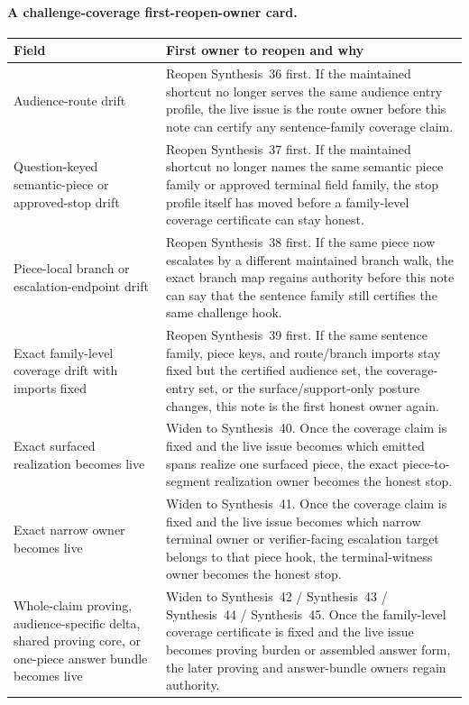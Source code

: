 \documentclass[11pt]{article}
\begin{document}
\paragraph{A challenge-coverage first-reopen-owner card.}
\begin{table}[t]
\centering
\small
\begin{tabularx}{\linewidth}{@{}LY@{}}
\toprule
Field & First owner to reopen and why \\
\midrule
Audience-route drift & Reopen Synthesis~36 first. If the maintained shortcut no longer serves the same audience entry profile, the live issue is the route owner before this note can certify any sentence-family coverage claim. \\
Question-keyed semantic-piece or approved-stop drift & Reopen Synthesis~37 first. If the maintained shortcut no longer names the same semantic piece family or approved terminal field family, the stop profile itself has moved before a family-level coverage certificate can stay honest. \\
Piece-local branch or escalation-endpoint drift & Reopen Synthesis~38 first. If the same piece now escalates by a different maintained branch walk, the exact branch map regains authority before this note can say that the sentence family still certifies the same challenge hook. \\
Exact family-level coverage drift with imports fixed & Reopen Synthesis~39 first. If the same sentence family, piece keys, and route/branch imports stay fixed but the certified audience set, the coverage-entry set, or the \textsf{surface}/\textsf{support-only} posture changes, this note is the first honest owner again. \\
Exact surfaced realization becomes live & Widen to Synthesis~40. Once the coverage claim is fixed and the live issue becomes which emitted spans realize one surfaced piece, the exact piece-to-segment realization owner becomes the honest stop. \\
Exact narrow owner becomes live & Widen to Synthesis~41. Once the coverage claim is fixed and the live issue becomes which narrow terminal owner or verifier-facing escalation target belongs to that piece hook, the terminal-witness owner becomes the honest stop. \\
Whole-claim proving, audience-specific delta, shared proving core, or one-piece answer bundle becomes live & Widen to Synthesis~42 / Synthesis~43 / Synthesis~44 / Synthesis~45. Once the family-level coverage certificate is fixed and the live issue becomes proving burden or assembled answer form, the later proving and answer-bundle owners regain authority. \\

\end{tabularx}
\end{table}
\end{document}
